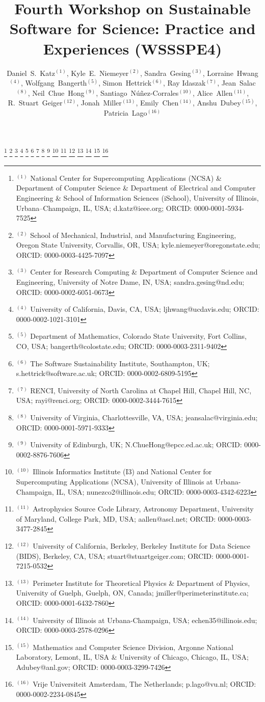 \documentclass[11pt, oneside]{amsart}
\begin{document}
\title[]{Fourth Workshop on Sustainable Software for Science: Practice and Experiences (WSSSPE4)}

\author{Daniel~S.~Katz$^{(1)}$,
Kyle~E.~Niemeyer$^{(2)}$,
Sandra~Gesing$^{(3)}$,
Lorraine~Hwang$^{(4)}$,
Wolfgang~Bangerth$^{(5)}$,
Simon~Hettrick$^{(6)}$,
Ray Idaszak$^{(7)}$,
Jean~Salac$^{(8)}$,
Neil~Chue~Hong$^{(9)}$,
Santiago~N\'u\~nez-Corrales$^{(10)}$,
Alice~Allen$^{(11)}$,
R.~Stuart~Geiger$^{(12)}$,
Jonah~Miller$^{(13)}$,
Emily~Chen$^{(14)}$,
Anshu~Dubey$^{(15)}$,
Patricia~Lago$^{(16)}$
}

%
\thanks{{}$^{(1)}$ National Center for Supercomputing Applications (NCSA) \&
Department of Computer Science  \&
Department of Electrical and Computer Engineering  \&
School of Information Sciences (iSchool),
University of Illinois, Urbana--Champaign, IL, USA; d.katz@ieee.org; ORCID: 0000-0001-5934-7525}
%
\thanks{{}$^{(2)}$ School of Mechanical, Industrial, and Manufacturing Engineering,
Oregon State University, Corvallis, OR, USA; kyle.niemeyer@oregonstate.edu; ORCID: 0000-0003-4425-7097}
%
\thanks{{}$^{(3)}$ Center for Research Computing \& Department of Computer Science and Engineering,
University of Notre Dame, IN, USA; sandra.gesing@nd.edu; ORCID: 0000-0002-6051-0673}
%
\thanks{{}$^{(4)}$ University of California, Davis, CA, USA; ljhwang@ucdavis.edu; ORCID: 0000-0002-1021-3101}
%
\thanks{{}$^{(5)}$ Department of Mathematics, Colorado State
  University, Fort Collins, CO, USA; bangerth@colostate.edu; ORCID: 0000-0003-2311-9402}
%
\thanks{{}$^{(6)}$ The Software Sustainability Institute, Southampton, UK; s.hettrick@software.ac.uk; ORCID: 0000-0002-6809-5195}
%
\thanks{{}$^{(7)}$ RENCI, University of North Carolina at Chapel Hill, Chapel Hill, NC, USA; rayi@renci.org; ORCID: 0000-0002-3444-7615}
%
\thanks{{}$^{(8)}$ University of Virginia, Charlottesville, VA, USA; jeansalac@virginia.edu; ORCID: 0000-0001-5971-9333}
%
\thanks{{}$^{(9)}$ University of Edinburgh, UK; N.ChueHong@epcc.ed.ac.uk;
ORCID: 0000-0002-8876-7606}
%
\thanks{{}$^{(10)}$ Illinois Informatics Institute (I3) and National Center for Supercomputing Applications (NCSA), University of Illinois at Urbana-Champaign, IL, USA;
nunezco2@illinois.edu;
ORCID: 0000-0003-4342-6223}
%
\thanks{{}$^{(11)}$ Astrophysics Source Code Library, Astronomy Department, University of Maryland, College Park, MD, USA; aallen@ascl.net; ORCID: 0000-0003-3477-2845}
%
\thanks{{}$^{(12)}$ University of California, Berkeley, Berkeley Institute for Data Science (BIDS), Berkeley, CA, USA; stuart@stuartgeiger.com; ORCID: 0000-0001-7215-0532}
%
\thanks{{}$^{(13)}$ Perimeter Institute for Theoretical Physics \&
Department of Physics, University of Guelph,
Guelph, ON, Canada;
jmiller@perimeterinstitute.ca; ORCID: 0000-0001-6432-7860}
%
\thanks{{}$^{(14)}$ University of Illinois at Urbana-Champaign, USA; echen35@illinois.edu; ORCID: 0000-0003-2578-0296}
%
\thanks{{}$^{(15)}$ Mathematics and Computer Science Division,
Argonne National Laboratory,
Lemont, IL, USA \&
University of Chicago,
Chicago, IL, USA;
Adubey@anl.gov;
ORCID: 0000-0003-3299-7426}
%
\thanks{{}$^{(16)}$ Vrije Universiteit Amsterdam, The Netherlands; p.lago@vu.nl; ORCID: 0000-0002-2234-0845}
\end{document}
